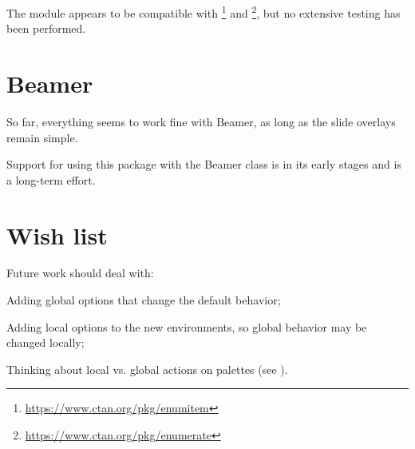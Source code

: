 \documentclass[a4paper, 11pt]{article}
\begin{document}
The module  appears to be compatible with \footnote{\url{https://www.ctan.org/pkg/enumitem}} and \footnote{\url{https://www.ctan.org/pkg/enumerate}}, but no extensive testing has been performed.


\section{Beamer}

So far, everything seems to work fine with Beamer, as long as the slide overlays remain simple.

Support for using this package with the Beamer class is in its early stages and is a long-term effort.

%


\section{Wish list}

Future work should deal with:
\begin{itemizeitemize}
    \item Adding global options that change the default behavior;
    \item Adding local options to the new environments, so global behavior may be changed locally;
    \item Thinking about local vs. global actions on palettes (see ).
\end{itemizeitemize}

\clearpage
\appendix
\end{document}
